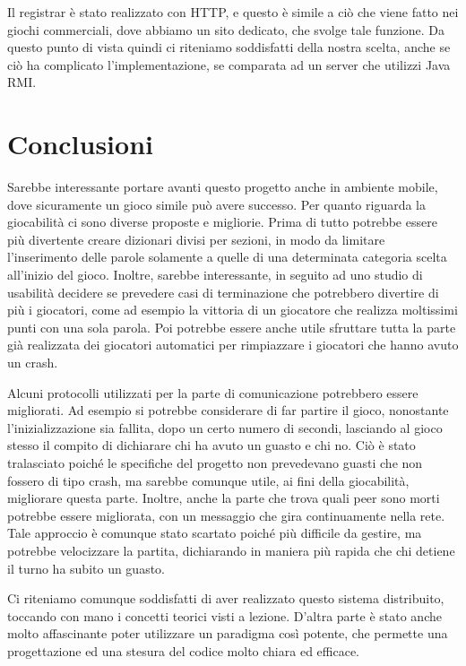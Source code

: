 \documentclass[10.5pt]{article}
\begin{document}
Il registrar è stato realizzato con HTTP, e questo è simile a ciò che viene fatto nei giochi commerciali, dove abbiamo un sito dedicato, che svolge tale funzione. Da questo punto di vista quindi ci riteniamo soddisfatti della nostra scelta, anche se ciò ha complicato l'implementazione, se comparata ad un server che utilizzi Java RMI.

\section{Conclusioni}

Sarebbe interessante portare avanti questo progetto anche in ambiente mobile, dove sicuramente un gioco simile può avere successo. Per quanto riguarda la giocabilità ci sono diverse proposte e migliorie. Prima di tutto potrebbe essere più divertente creare dizionari divisi per sezioni, in modo da limitare l'inserimento delle parole solamente a quelle di una determinata categoria scelta all'inizio del gioco. Inoltre, sarebbe interessante, in seguito ad uno studio di usabilità decidere se prevedere casi di terminazione che potrebbero divertire di più i giocatori, come ad esempio la vittoria di un giocatore che realizza moltissimi punti con una sola parola. Poi potrebbe essere anche utile sfruttare tutta la parte già realizzata dei giocatori automatici per rimpiazzare i giocatori che hanno avuto un crash.

Alcuni protocolli utilizzati per la parte di comunicazione potrebbero essere migliorati. Ad esempio si potrebbe considerare di far partire il gioco, nonostante l'inizializzazione sia fallita, dopo un certo numero di secondi, lasciando al gioco stesso il compito di dichiarare chi ha avuto un guasto e chi no. Ciò è stato tralasciato poiché le specifiche del progetto non prevedevano guasti che non fossero di tipo crash, ma sarebbe comunque utile, ai fini della giocabilità, migliorare questa parte. Inoltre, anche la parte che trova quali peer sono morti potrebbe essere migliorata, con un messaggio che gira continuamente nella rete. Tale approccio è comunque stato scartato poiché più difficile da gestire, ma potrebbe velocizzare la partita, dichiarando in maniera più rapida che chi detiene il turno ha subito un guasto.

Ci riteniamo comunque soddisfatti di aver realizzato questo sistema distribuito, toccando con mano i concetti teorici visti a lezione. D'altra parte è stato anche molto affascinante poter utilizzare un paradigma così potente, che permette una progettazione ed una stesura del codice molto chiara ed efficace.



\end{document}
